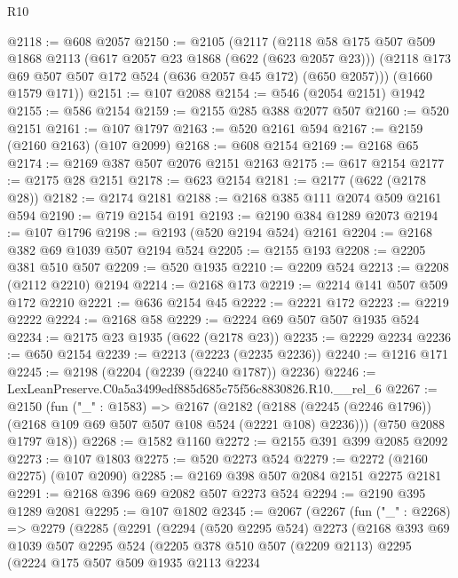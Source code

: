\begin{lexlean}{R10}
\begin{coremodule}
@2118 := @608 @2057
@2150 := @2105
    (@2117
      (@2118
        @58
        @175
        @507
        @509
        @1868
        @2113
        (@617 @2057 @23 @1868 (@622 (@623 @2057 @23)))
        (@2118 @173 @69 @507 @507 @172 @524 (@636 @2057 @45 @172) (@650 @2057)))
      (@1660 @1579 @171))
@2151 := @107 @2088
@2154 := @546 (@2054 @2151) @1942
@2155 := @586 @2154
@2159 := @2155 @285 @388 @2077 @507
@2160 := @520 @2151
@2161 := @107 @1797
@2163 := @520 @2161 @594
@2167 := @2159 (@2160 @2163) (@107 @2099)
@2168 := @608 @2154
@2169 := @2168 @65
@2174 := @2169 @387 @507 @2076 @2151 @2163
@2175 := @617 @2154
@2177 := @2175 @28 @2151
@2178 := @623 @2154
@2181 := @2177 (@622 (@2178 @28))
@2182 := @2174 @2181
@2188 := @2168 @385 @111 @2074 @509 @2161 @594
@2190 := @719 @2154 @191
@2193 := @2190 @384 @1289 @2073
@2194 := @107 @1796
@2198 := @2193 (@520 @2194 @524) @2161
@2204 := @2168 @382 @69 @1039 @507 @2194 @524
@2205 := @2155 @193
@2208 := @2205 @381 @510 @507
@2209 := @520 @1935
@2210 := @2209 @524
@2213 := @2208 (@2112 @2210) @2194
@2214 := @2168 @173
@2219 := @2214 @141 @507 @509 @172 @2210
@2221 := @636 @2154 @45
@2222 := @2221 @172
@2223 := @2219 @2222
@2224 := @2168 @58
@2229 := @2224 @69 @507 @507 @1935 @524
@2234 := @2175 @23 @1935 (@622 (@2178 @23))
@2235 := @2229 @2234
@2236 := @650 @2154
@2239 := @2213 (@2223 (@2235 @2236))
@2240 := @1216 @171
@2245 := @2198 (@2204 (@2239 (@2240 @1787)) @2236)
@2246 := LexLeanPreserve.C0a5a3499edf885d685c75f56c8830826.R10.__rel_6
@2267 := @2150
    (fun ("_" : @1583) =>
    @2167
      (@2182 (@2188 (@2245 (@2246 @1796)) (@2168 @109 @69 @507 @507 @108 @524 (@2221 @108) @2236)))
      (@750 @2088 @1797 @18))
@2268 := @1582 @1160
@2272 := @2155 @391 @399 @2085 @2092
@2273 := @107 @1803
@2275 := @520 @2273 @524
@2279 := @2272 (@2160 @2275) (@107 @2090)
@2285 := @2169 @398 @507 @2084 @2151 @2275 @2181
@2291 := @2168 @396 @69 @2082 @507 @2273 @524
@2294 := @2190 @395 @1289 @2081
@2295 := @107 @1802
@2345 := @2067
    (@2267
      (fun ("_" : @2268) =>
      @2279
        (@2285
          (@2291
            (@2294
              (@520 @2295 @524)
              @2273
              (@2168
                @393
                @69
                @1039
                @507
                @2295
                @524
                (@2205
                  @378
                  @510
                  @507
                  (@2209 @2113)
                  @2295
                  (@2224
                    @175
                    @507
                    @509
                    @1935
                    @2113
                    @2234

\end{coremodule}
\end{lexlean}
